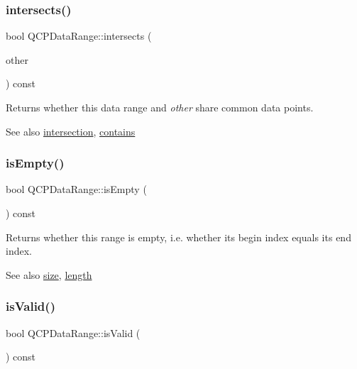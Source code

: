 \subsubsection{\texorpdfstring{intersects()}{intersects()}}
{\footnotesize\ttfamily bool Q\+C\+P\+Data\+Range\+::intersects (\begin{DoxyParamCaption}\item[{const \mbox{\hyperlink{class_q_c_p_data_range}{Q\+C\+P\+Data\+Range}} \&}]{other }\end{DoxyParamCaption}) const}

Returns whether this data range and {\itshape other} share common data points.

\begin{DoxySeeAlso}{See also}
\mbox{\hyperlink{class_q_c_p_data_range_a84e1e03129dd52528efb4bac18d30183}{intersection}}, \mbox{\hyperlink{class_q_c_p_data_range_a13ca398776374a3160aa85433718b812}{contains}} 
\end{DoxySeeAlso}
\mbox{\label{class_q_c_p_data_range_ac32e53fc05d6cd2eac96b96a7265d3b8}} 
\subsubsection{\texorpdfstring{isEmpty()}{isEmpty()}}
{\footnotesize\ttfamily bool Q\+C\+P\+Data\+Range\+::is\+Empty (\begin{DoxyParamCaption}{ }\end{DoxyParamCaption}) const\hspace{0.3cm}{\ttfamily [inline]}}

Returns whether this range is empty, i.\+e. whether its begin index equals its end index.

\begin{DoxySeeAlso}{See also}
\mbox{\hyperlink{class_q_c_p_data_range_ac6af055e509d1b691c244954ff1c5887}{size}}, \mbox{\hyperlink{class_q_c_p_data_range_a1e7836058f755c6ab9f11996477b7150}{length}} 
\end{DoxySeeAlso}
\mbox{\label{class_q_c_p_data_range_aae53a37472212dca0a7939963e20dba0}} 
\subsubsection{\texorpdfstring{isValid()}{isValid()}}
{\footnotesize\ttfamily bool Q\+C\+P\+Data\+Range\+::is\+Valid (\begin{DoxyParamCaption}{ }\end{DoxyParamCaption}) const\hspace{0.3cm}{\ttfamily [inline]}}

